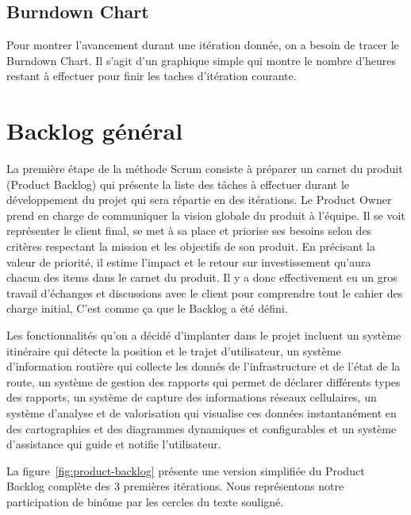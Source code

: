 
\subsection{Burndown Chart}

Pour montrer l'avancement durant une itération donnée, on a besoin de tracer le
Burndown Chart. Il s'agit d'un graphique simple qui montre le nombre d'heures
restant à effectuer pour finir les taches d'itération courante.

\section{Backlog général}

La première étape de la méthode Scrum consiste à préparer un carnet du produit
(Product Backlog) qui présente la liste des tâches à effectuer durant le
développement du projet qui sera répartie en des itérations. Le Product Owner
prend en charge de communiquer la vision globale du produit à l'équipe. Il se
voit représenter le client final, se met à sa place et priorise ses besoins
selon des critères respectant la mission et les objectifs de son produit. En
précisant la valeur de priorité, il estime l'impact et le retour sur
investissement qu'aura chacun des items dans le carnet du produit. Il y a donc
effectivement eu un gros travail d'échanges et discussions avec le client pour
comprendre tout le cahier des charge initial, C'est comme ça que le Backlog a
été défini.

Les fonctionnalités qu'on a décidé d'implanter dans le projet  incluent un système itinéraire qui détecte la position et le trajet
d'utilisateur, un système d'information routière qui collecte les donnés de
l'infrastructure et de l'état de la route, un système de gestion des rapports
qui permet de déclarer différents types des rapports, un système de capture des
informations réseaux cellulaires, un système d'analyse et de valorisation qui
visualise ces données instantanément en des cartographies et des diagrammes
dynamiques et configurables et un système d'assistance qui guide et notifie
l'utilisateur.

La figure~\ref{fig:product-backlog} présente une version simplifiée du Product
Backlog complète des 3 premières itérations. Nous représentons notre
participation de binôme par les cercles du texte souligné.

